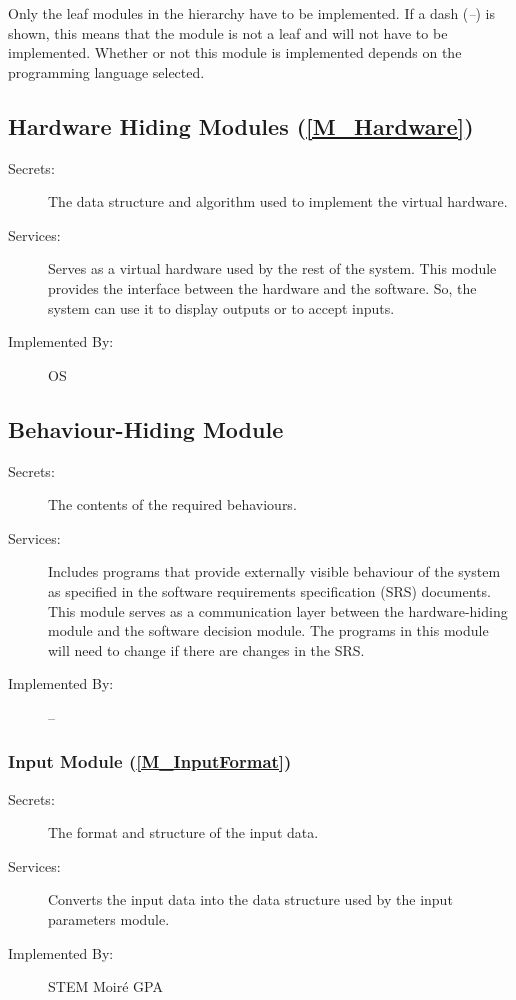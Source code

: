 \documentclass[12pt, titlepage]{article}
\newcommand{\progname}{STEM Moir{\'e} GPA}
\begin{document}
Only the leaf modules in the
hierarchy have to be implemented. If a dash (\emph{--}) is shown, this means
that the module is not a leaf and will not have to be implemented. Whether or
not this module is implemented depends on the programming language
selected.

\subsection{Hardware Hiding Modules (\cref{M_Hardware})}

\begin{description}
\item[Secrets:]The data structure and algorithm used to implement the virtual
  hardware.
\item[Services:]Serves as a virtual hardware used by the rest of the
  system. This module provides the interface between the hardware and the
  software. So, the system can use it to display outputs or to accept inputs.
\item[Implemented By:] OS
\end{description}

\subsection{Behaviour-Hiding Module}

\begin{description}
\item[Secrets:]The contents of the required behaviours.
\item[Services:]Includes programs that provide externally visible behaviour of
  the system as specified in the software requirements specification (SRS)
  documents. This module serves as a communication layer between the
  hardware-hiding module and the software decision module. The programs in this
  module will need to change if there are changes in the SRS.
\item[Implemented By:] --
\end{description}

\subsubsection{Input Module (\cref{M_InputFormat})}

\begin{description}
\item[Secrets:]The format and structure of the input data.
\item[Services:]Converts the input data into the data structure used by the
  input parameters module.
\item[Implemented By:] \progname{}
\end{description}
\end{document}
